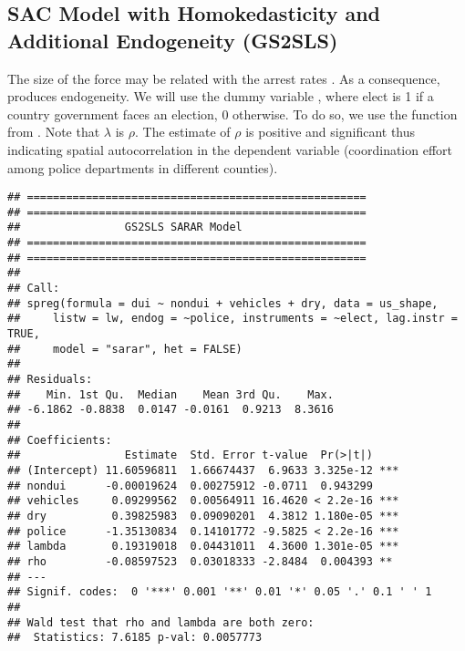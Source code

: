 \subsection{SAC Model with Homokedasticity and Additional Endogeneity (GS2SLS)}

The size of the  force may be related with the arrest rates . As a consequence,  produces endogeneity. We will use the dummy variable , where elect is 1 if a country government faces an election, 0 otherwise. To do so, we use the  function from . Note that $\lambda$ is $\rho$. The estimate of $\rho$ is positive and significant thus indicating spatial autocorrelation in the dependent variable (coordination effort among police departments in different counties). 


\begin{knitrout}
\color{fgcolor}\begin{kframe}
\begin{alltt}
 \hlkwb{<-}  \hlopt{~}  \hlopt{+}  \hlopt{+} 
                 
                 
                \hlstd{=} \hlopt{~} 
                \hlstd{=} \hlopt{~} 
                \hlstd{=} \hlstd{,}
                \hlstd{=} \hlstd{,}
                \hlstd{=} \hlstd{)}
\end{alltt}
\begin{verbatim}
## ====================================================
## ====================================================
##                GS2SLS SARAR Model
## ====================================================
## ====================================================
## 
## Call:
## spreg(formula = dui ~ nondui + vehicles + dry, data = us_shape, 
##     listw = lw, endog = ~police, instruments = ~elect, lag.instr = TRUE, 
##     model = "sarar", het = FALSE)
## 
## Residuals:
##    Min. 1st Qu.  Median    Mean 3rd Qu.    Max. 
## -6.1862 -0.8838  0.0147 -0.0161  0.9213  8.3616 
## 
## Coefficients:
##                Estimate  Std. Error t-value  Pr(>|t|)    
## (Intercept) 11.60596811  1.66674437  6.9633 3.325e-12 ***
## nondui      -0.00019624  0.00275912 -0.0711  0.943299    
## vehicles     0.09299562  0.00564911 16.4620 < 2.2e-16 ***
## dry          0.39825983  0.09090201  4.3812 1.180e-05 ***
## police      -1.35130834  0.14101772 -9.5825 < 2.2e-16 ***
## lambda       0.19319018  0.04431011  4.3600 1.301e-05 ***
## rho         -0.08597523  0.03018333 -2.8484  0.004393 ** 
## ---
## Signif. codes:  0 '***' 0.001 '**' 0.01 '*' 0.05 '.' 0.1 ' ' 1
## 
## Wald test that rho and lambda are both zero:
##  Statistics: 7.6185 p-val: 0.0057773
\end{verbatim}
\end{kframe}
\end{knitrout}




